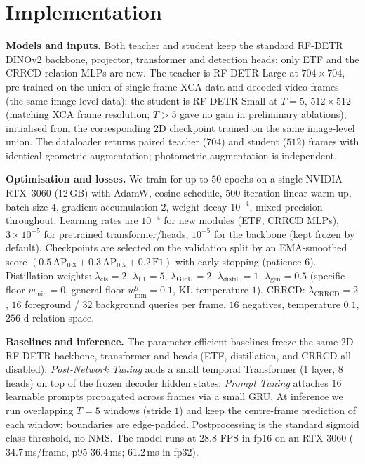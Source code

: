 \documentclass[conference]{IEEEtran}
\begin{document}
\section{Implementation}
\label{sec:impl}

\textbf{Models and inputs.} Both teacher and student keep the standard RF-DETR DINOv2 backbone, projector, transformer and detection heads; only ETF and the CRRCD relation MLPs are new. The teacher is RF-DETR Large at $704{\times}704$, pre-trained on the union of single-frame XCA data and decoded video frames (the same image-level data); the student is RF-DETR Small at $T{=}5$, $512{\times}512$ (matching XCA frame resolution; $T{>}5$ gave no gain in preliminary ablations), initialised from the corresponding 2D checkpoint trained on the same image-level union. The dataloader returns paired teacher ($704$) and student ($512$) frames with identical geometric augmentation; photometric augmentation is independent.

\textbf{Optimisation and losses.} We train for up to $50$ epochs on a single NVIDIA RTX~3060 (12\,GB) with AdamW, cosine schedule, $500$-iteration linear warm-up, batch size $4$, gradient accumulation $2$, weight decay $10^{-4}$, mixed-precision throughout. Learning rates are $10^{-4}$ for new modules (ETF, CRRCD MLPs), $3\!\times\!10^{-5}$ for pretrained transformer/heads, $10^{-5}$ for the backbone (kept frozen by default). Checkpoints are selected on the validation split by an EMA-smoothed score $(0.5\,\text{AP}_{0.3} + 0.3\,\text{AP}_{0.5} + 0.2\,\text{F1})$ with early stopping (patience $6$). Distillation weights: $\lambda_{\text{cls}}{=}2$, $\lambda_{\text{L1}}{=}5$, $\lambda_{\text{GIoU}}{=}2$, $\lambda_{\text{distill}}{=}1$, $\lambda_{\text{gen}}{=}0.5$ (specific floor $w_{\min}{=}0$, general floor $w^{g}_{\min}{=}0.1$, KL temperature $1$). CRRCD: $\lambda_{\text{CRRCD}}{=}2$, $16$ foreground / $32$ background queries per frame, $16$ negatives, temperature $0.1$, $256$-d relation space.

\textbf{Baselines and inference.} The parameter-efficient baselines freeze the same 2D RF-DETR backbone, transformer and heads (ETF, distillation, and CRRCD all disabled): \emph{Post-Network Tuning} adds a small temporal Transformer (1 layer, 8 heads) on top of the frozen decoder hidden states; \emph{Prompt Tuning} attaches $16$ learnable prompts propagated across frames via a small GRU. At inference we run overlapping $T{=}5$ windows (stride $1$) and keep the centre-frame prediction of each window; boundaries are edge-padded. Postprocessing is the standard sigmoid class threshold, no NMS. The model runs at $28.8$ FPS in fp16 on an RTX 3060 ($34.7$\,ms/frame, p95 $36.4$\,ms; $61.2$\,ms in fp32).
\end{document}
